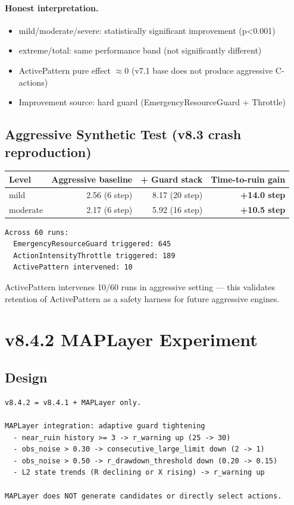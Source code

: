 \documentclass[11pt,a4paper]{article}
\begin{document}
\paragraph{Honest interpretation.}
\begin{itemize}
  \item mild/moderate/severe: statistically significant improvement (p<0.001)
  \item extreme/total: same performance band (not significantly different)
  \item ActivePattern pure effect $\approx 0$ (v7.1 base does not produce aggressive C-actions)
  \item Improvement source: hard guard (EmergencyResourceGuard + Throttle)
\end{itemize}

\subsection{Aggressive Synthetic Test (v8.3 crash reproduction)}

\begin{tabular}{lrrr}
\toprule
\textbf{Level} & \textbf{Aggressive baseline} & \textbf{+ Guard stack} & \textbf{Time-to-ruin gain} \\
\midrule
mild     & 2.56 (6 step)  & 8.17 (20 step) & \textbf{+14.0 step} \\
moderate & 2.17 (6 step)  & 5.92 (16 step) & \textbf{+10.5 step} \\
\bottomrule
\end{tabular}

\begin{verbatim}
Across 60 runs:
  EmergencyResourceGuard triggered: 645
  ActionIntensityThrottle triggered: 189
  ActivePattern intervened: 10
\end{verbatim}

ActivePattern intervenes 10/60 runs in aggressive setting — this validates retention of ActivePattern as a safety harness for future aggressive engines.

\section{v8.4.2 MAPLayer Experiment}

\subsection{Design}

\begin{verbatim}
v8.4.2 = v8.4.1 + MAPLayer only.

MAPLayer integration: adaptive guard tightening
  - near_ruin history >= 3 -> r_warning up (25 -> 30)
  - obs_noise > 0.30 -> consecutive_large_limit down (2 -> 1)
  - obs_noise > 0.50 -> r_drawdown_threshold down (0.20 -> 0.15)
  - L2 state trends (R declining or X rising) -> r_warning up

MAPLayer does NOT generate candidates or directly select actions.
\end{verbatim}
\end{document}
